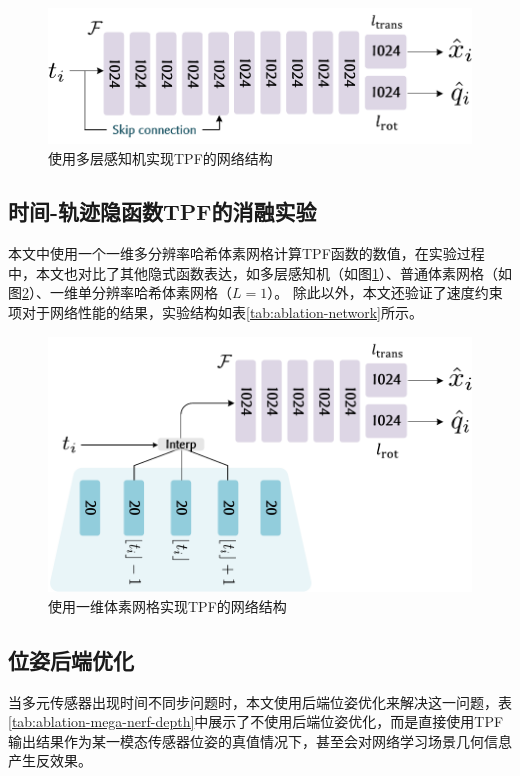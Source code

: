 \begin{figure}[ht]
    \centering
    \includegraphics[width=\textwidth]{undergraduate-thesis/images/experiments/time-pose MLP.pdf}
    \caption{使用多层感知机实现TPF的网络结构}
    \label{fig:time-pose function ablation mlp}
\end{figure}

\subsection{时间-轨迹隐函数TPF的消融实验}
本文中使用一个一维多分辨率哈希体素网格计算TPF函数的数值，在实验过程中，本文也对比了其他隐式函数表达，如多层感知机（如图\ref{fig:time-pose function ablation mlp}）、普通体素网格（如图\ref{fig:time-pose function ablation grid}）、一维单分辨率哈希体素网格（$L=1$）。
除此以外，本文还验证了速度约束项对于网络性能的结果，实验结构如表\ref{tab:ablation-network}所示。

\begin{figure}[ht]
    \centering
    \includegraphics[width=\textwidth]{undergraduate-thesis/images/experiments/FeatureGrid.pdf}
    \caption{使用一维体素网格实现TPF的网络结构}
    \label{fig:time-pose function ablation grid}
\end{figure}

\subsection{位姿后端优化}
当多元传感器出现时间不同步问题时，本文使用后端位姿优化来解决这一问题，表\ref{tab:ablation-mega-nerf-depth}中展示了不使用后端位姿优化，而是直接使用TPF输出结果作为某一模态传感器位姿的真值情况下，甚至会对网络学习场景几何信息产生反效果。



